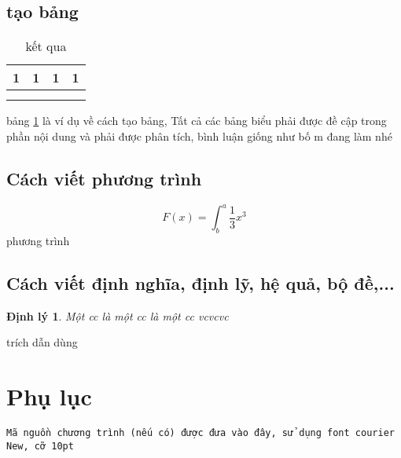 \documentclass{article}
\newtheorem{theorem}{Định lý}[section]
\begin{document}
\subsection{tạo bảng}
\begin{table}[H]
    \centering
     \caption{kết qua}
    \begin{tabular}{|c|c|c|c|}
    \hline
      1  &  1& 1 &1 \\\hline
        &  &  &\\\hline
        &  &  &\\\hline
      
    \end{tabular}
   
    \label{vailonluon}
\end{table}
bảng \ref{vailonluon} là ví dụ về cách tạo bảng, Tất cả các bảng biểu phải được đề cập trong phần nội dung và phải được phân tích, bình luận giống như bố m đang làm nhé

\subsection{Cách viết phương trình}
\begin{equation} \label{pt31}
    F(x) = \int^a_b \frac{1}{3}x^3
\end{equation}
phương trình

\subsection{Cách viết định nghĩa, định lỹ, hệ quả, bộ đề,...}
\begin{theorem}
    Một cc là một cc là một cc vcvcvc
\end{theorem}
\cleardoublepage

\cleardoublepage
{}


trích dẫn dùng \cite{floyd2013electronics}

\cleardoublepage
\section*{Phụ lục}
\texttt{\fontsize{10pt}{0pt}\selectfont Mã nguồn chương trình (nếu có) được đưa vào đây, sử dụng font courier New, cỡ 10pt }
\end{document}
